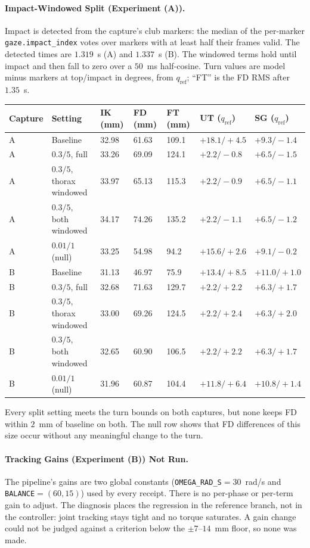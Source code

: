 \documentclass[11pt,a4paper]{article}
\begin{document}
\paragraph{Impact-Windowed Split (Experiment (A)).} Impact is detected from the capture's club markers: the median of the per-marker \texttt{gaze.impact\_index} votes over markers with at least half their frames valid. The detected times are $1.319$~s (A) and $1.337$~s (B). The windowed terms hold until impact and then fall to zero over a $50$~ms half-cosine. Turn values are model minus markers at top/impact in degrees, from $q_{\mathrm{ref}}$; ``FT'' is the FD RMS after $1.35$~s.
\begin{center}
\small
\begin{tabular}{lllllll}
\hline
Capture & Setting & IK (mm) & FD (mm) & FT (mm) & UT ($q_{\mathrm{ref}}$) & SG ($q_{\mathrm{ref}}$) \\
\hline
A & Baseline & 32.98 & 61.63 & 109.1 & $+18.1/+4.5$ & $+9.3/-1.4$ \\
A & $0.3/5$, full & 33.26 & 69.09 & 124.1 & $+2.2/-0.8$ & $+6.5/-1.5$ \\
A & $0.3/5$, thorax windowed & 33.97 & 65.13 & 115.3 & $+2.2/-0.9$ & $+6.5/-1.1$ \\
A & $0.3/5$, both windowed & 34.17 & 74.26 & 135.2 & $+2.2/-1.1$ & $+6.5/-1.2$ \\
A & $0.01/1$ (null) & 33.25 & 54.98 & 94.2 & $+15.6/+2.6$ & $+9.1/-0.2$ \\
B & Baseline & 31.13 & 46.97 & 75.9 & $+13.4/+8.5$ & $+11.0/+1.0$ \\
B & $0.3/5$, full & 32.68 & 71.63 & 129.7 & $+2.2/+2.2$ & $+6.3/+1.7$ \\
B & $0.3/5$, thorax windowed & 33.00 & 69.26 & 124.5 & $+2.2/+2.4$ & $+6.3/+2.0$ \\
B & $0.3/5$, both windowed & 32.65 & 60.90 & 106.5 & $+2.2/+2.2$ & $+6.3/+1.7$ \\
B & $0.01/1$ (null) & 31.96 & 60.87 & 104.4 & $+11.8/+6.4$ & $+10.8/+1.4$ \\
\hline
\end{tabular}
\end{center}
Every split setting meets the turn bounds on both captures, but none keeps FD within $2$~mm of baseline on both. The null row shows that FD differences of this size occur without any meaningful change to the turn.

\paragraph{Tracking Gains (Experiment (B)) Not Run.} The pipeline's gains are two global constants (\texttt{OMEGA\_RAD\_S}$=30$~rad/s and \texttt{BALANCE}$=(60,15)$) used by every receipt. There is no per-phase or per-term gain to adjust. The diagnosis places the regression in the reference branch, not in the controller: joint tracking stays tight and no torque saturates. A gain change could not be judged against a criterion below the $\pm7$--$14$~mm floor, so none was made.
\end{document}
